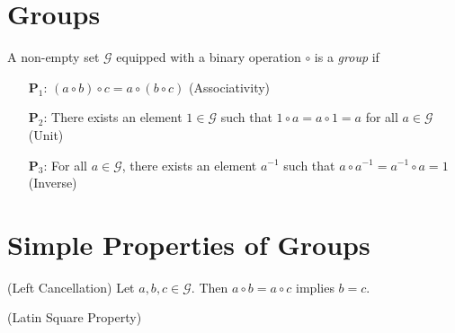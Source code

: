 \section{Groups}

A non-empty set $\mathcal{G}$ equipped with a binary operation $\circ$ is a \textit{group} if 
\begin{itemize}
    \item[$\mathbf{P}_1$:] $(a \circ b) \circ c = a \circ (b \circ c)$ (Associativity)
    \item[$\mathbf{P}_2$:] There exists an element $1 \in \mathcal{G}$ such that $1 \circ a = a \circ 1 = a$ for all $a \in \mathcal{G}$ (Unit)
    \item[$\mathbf{P}_3$:] For all $a \in \mathcal{G}$, there exists an element $a^{-1}$ such that $a \circ a^{-1} = a^{-1} \circ a = 1$ (Inverse)
\end{itemize}


\section{Simple Properties of Groups}
\theorem (Left Cancellation) Let $a,b,c \in \mathcal{G}$. Then $a \circ b = a \circ c$ implies $b = c$.

\theorem (Latin Square Property) 

